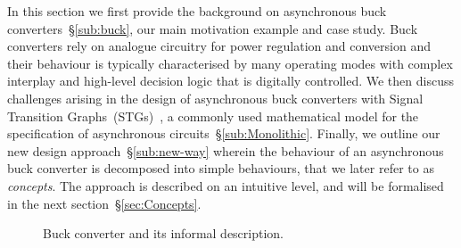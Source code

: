 \documentclass[british,compsoc]{IEEEtran}
\begin{document}
In this section we first provide the background on asynchronous buck
converters~\S\ref{sub:buck}, our main motivation example and case study.
Buck converters rely on analogue circuitry for power regulation and
conversion and their behaviour is typically characterised by many operating
modes with complex interplay and high-level decision logic that is digitally
controlled.
We then discuss challenges arising in the design of asynchronous buck converters
with Signal Transition Graphs~(STGs)~\cite{Chu_1987_phd}\cite{Rosenblum_1985_tpn},
a commonly used mathematical model for the specification of asynchronous
circuits~\S\ref{sub:Monolithic}.
Finally, we outline our new design approach~\S\ref{sub:new-way} wherein the
behaviour of an asynchronous buck converter is decomposed into simple
behaviours, that we later refer to as \emph{concepts}. The approach is
described on an intuitive level, and will be formalised in the next
section~\S\ref{sec:Concepts}.

\begin{figure}[t]
\begin{centering}
\par
{}
\par
\end{centering}
\protect\caption{\label{fig:buck}Buck converter and its informal description.}
\end{figure}
\end{document}
